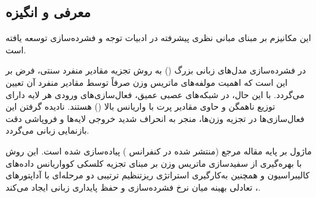 \subsection{معرفی و انگیزه}
این مکانیزم بر مبنای مبانی نظری پیشرفته در ادبیات توجه و فشرده‌سازی \cite{wang2024svdllm} توسعه یافته است.

در فشرده‌سازی مدل‌های زبانی بزرگ () به روش تجزیه مقادیر منفرد سنتی، فرض بر این است که اهمیت مولفه‌های ماتریس وزن صرفاً توسط مقادیر منفرد آن تعیین می‌گردد. با این حال، در شبکه‌های عصبی عمیق، فعال‌سازی‌های ورودی هر لایه دارای توزیع ناهمگن و حاوی مقادیر پرت با واریانس بالا () هستند. نادیده گرفتن این فعال‌سازی‌ها در تجزیه وزن‌ها، منجر به انحراف شدید خروجی لایه‌ها و فروپاشی دقت بازنمایی زبانی می‌گردد.

ماژول  بر پایه مقاله مرجع  (منتشر شده در کنفرانس ) پیاده‌سازی شده است. این روش با بهره‌گیری از سفیدسازی ماتریس وزن بر مبنای تجزیه کلسکی کوواریانس داده‌های کالیبراسیون و همچنین به‌کارگیری استراتژی ریزتنظیم ترتیبی دو مرحله‌ای با آداپتورهای ، تعادلی بهینه میان نرخ فشرده‌سازی و حفظ پایداری زبانی ایجاد می‌کند.
